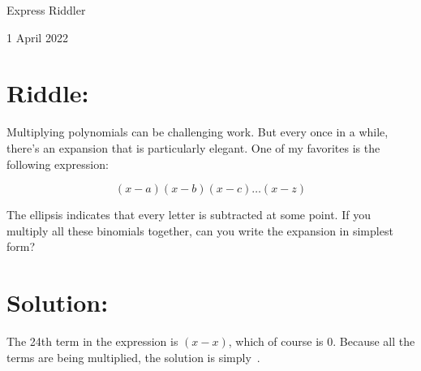 \documentclass{article}
\begin{document}
\pagestyle{empty} %

\begin{center}
{\LARGE Express Riddler}

\vspace{0.15in}

{\Large 1 April 2022}
\end{center}


\section*{Riddle:}

Multiplying polynomials can be challenging work. But every once in a while, there's an expansion that is particularly elegant.
One of my favorites is the following expression:

\[
(x-a)(x-b)(x-c)\dots(x-z)
\]

The ellipsis indicates that every letter is subtracted at some point.
If you multiply all these binomials together, can you write the expansion in simplest form?


\section*{Solution:}

The 24th term in the expression is $(x-x)$, which of course is 0.
Because all the terms are being multiplied, the solution is simply \,.
\end{document}
